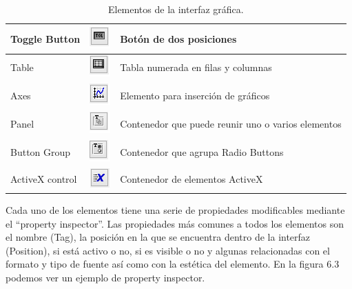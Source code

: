 \begin{table}[htb]
\begin{center}
{\begin{tabular}{|l|c|l|}
Toggle Button& \includegraphics{imagenes/iconosguide/togle.png}  &Botón de dos posiciones\\ \hline
Table&\includegraphics{imagenes/iconosguide/table.png}   &Tabla numerada en filas y columnas\\ \hline
Axes&\includegraphics{imagenes/iconosguide/axes.png}   &Elemento para inserción de gráficos\\ \hline
Panel&\includegraphics{imagenes/iconosguide/panel.png}  & Contenedor que puede reunir uno o varios elementos  \\ \hline
Button Group&\includegraphics{imagenes/iconosguide/butongroup.png}   &Contenedor que agrupa Radio Buttons\\ \hline
ActiveX control&\includegraphics{imagenes/iconosguide/activex.png}   &Contenedor de elementos ActiveX\\ \hline
\end{tabular}
}
\caption{Elementos de la interfaz gráfica.}
\end{center}
\end{table}
\bigskip

Cada uno de los elementos tiene una serie de propiedades modificables mediante el “property inspector”. Las propiedades más comunes a todos los elementos son el nombre (Tag), la posición en la que se encuentra dentro de la interfaz (Position), si está activo o no, si es visible o no y algunas relacionadas con el formato y tipo de fuente así como con la estética del elemento. En la figura 6.3 podemos ver un ejemplo de property inspector.
\bigskip

